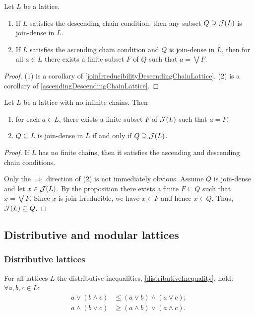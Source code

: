 \begin{proposition}
Let $L$ be a lattice.
\begin{enumerate}
\item If $L$ satisfies the descending chain condition, then any subset $Q\supseteq \operatorname{\mathcal{J}}(L)$ is join-dense in $L$.
\item If $L$ satisfies the ascending chain condition and $Q$ is join-dense in $L$, then for all $a\in L$ there exists a finite subset $F$ of $Q$ such that $a = \bigvee F$.
\end{enumerate}
\end{proposition}
\begin{proof}
(1) is a corollary of \ref{joinIrreducibilityDescendingChainLattice}. (2) is a corollary of \ref{ascendingDescendingChainLattice}.
\end{proof}
\begin{corollary}
Let $L$ be a lattice with no infinite chains. Then
\begin{enumerate}
\item for each $a \in L$, there exists a finite subset $F$ of $\operatorname{\mathcal{J}}(L)$ such that $a = F$.
\item $Q\subseteq L$ is join-dense in $L$ if and only if $Q \supseteq \operatorname{\mathcal{J}}(L)$.
\end{enumerate}
\end{corollary}
\begin{proof}
If $L$ has no finite chains, then it satisfies the ascending and descending chain conditions.

Only the $\Rightarrow$ direction of (2) is not immediately obvious. Assume $Q$ is join-dense and let $x\in \operatorname{\mathcal{J}}(L)$. By the proposition there exists a finite $F\subseteq Q$ such that $x = \bigvee F$. Since $x$ is join-irreducible, we have $x \in F$ and hence $x \in Q$. Thus, $\operatorname{\mathcal{J}}(L) \subseteq Q$.
\end{proof}


\subsection{Distributive and modular lattices}
\subsubsection{Distributive lattices}
For all lattices $L$ the distributive inequalities, \ref{distributiveInequality}, hold: $\forall a,b,c \in L$:
\begin{align*}
a \vee (b\wedge c) &\leq (a\vee b) \wedge (a\vee c); \\
a\wedge (b \vee c) &\geq (a\wedge b)\vee (a\wedge c).
\end{align*}

